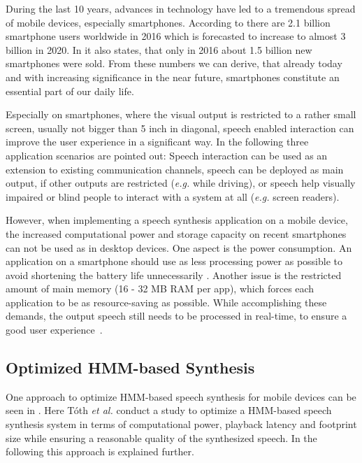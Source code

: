 During the last 10 years, advances in technology have led to a tremendous spread of mobile devices, especially smartphones. According to \cite{statista:smartphones} there are 2.1 billion smartphone users worldwide in 2016 which is forecasted to increase to almost 3 billion in 2020. In \cite{statista:smartphones} it also states, that only in 2016 about 1.5 billion new smartphones were sold. From these numbers we can derive, that already today and with increasing significance in the near future, smartphones constitute an essential part of our daily life.

Especially on smartphones, where the visual output is restricted to a rather small screen, usually not bigger than 5 inch in diagonal, speech enabled interaction can improve the user experience in a significant way. In \cite{toth:optimizing} the following three application scenarios are pointed out: Speech interaction can be used as an extension to existing communication channels, speech can be deployed as main output, if other outputs are restricted (\textit{e.g.} while driving), or speech help visually impaired or blind people to interact with a system at all (\textit{e.g.} screen readers).

However, when implementing a speech synthesis application on a mobile device, the increased computational power and storage capacity on recent smartphones can not be used as in desktop devices. One aspect is the power consumption. An application on a smartphone should use as less processing power as possible to avoid shortening the battery life unnecessarily \cite{toth:optimizing}. Another issue is the restricted amount of main memory (16 - 32 MB RAM per app), which forces each application to be as resource-saving as possible. While accomplishing these demands, the output speech still needs to be processed in real-time, to ensure a good user experience~\cite{boros:robust}.

\subsection{Optimized \ac{HMM}-based Synthesis}
\label{subsec:hmmembedded}

One approach to optimize \ac{HMM}-based speech synthesis for mobile devices can be seen in \cite{toth:optimizing}. Here T\'oth \textit{et al.} conduct a study to optimize a \ac{HMM}-based speech synthesis system in terms of computational power, playback latency and footprint size while ensuring a reasonable quality of the synthesized speech. In the following this approach is explained further.

